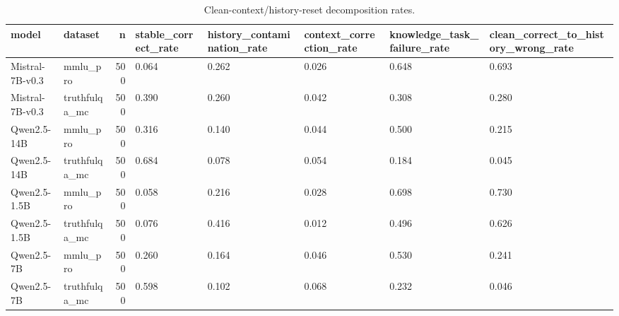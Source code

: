 \begin{table}
\caption{Clean-context/history-reset decomposition rates.}
\label{tab:decomposition_rates}
\begin{tabular}{llrlllll}
\toprule
model & dataset & n & stable\_correct\_rate & history\_contamination\_rate & context\_correction\_rate & knowledge\_task\_failure\_rate & clean\_correct\_to\_history\_wrong\_rate \\
\midrule
Mistral-7B-v0.3 & mmlu\_pro & 500 & 0.064 & 0.262 & 0.026 & 0.648 & 0.693 \\
Mistral-7B-v0.3 & truthfulqa\_mc & 500 & 0.390 & 0.260 & 0.042 & 0.308 & 0.280 \\
Qwen2.5-14B & mmlu\_pro & 500 & 0.316 & 0.140 & 0.044 & 0.500 & 0.215 \\
Qwen2.5-14B & truthfulqa\_mc & 500 & 0.684 & 0.078 & 0.054 & 0.184 & 0.045 \\
Qwen2.5-1.5B & mmlu\_pro & 500 & 0.058 & 0.216 & 0.028 & 0.698 & 0.730 \\
Qwen2.5-1.5B & truthfulqa\_mc & 500 & 0.076 & 0.416 & 0.012 & 0.496 & 0.626 \\
Qwen2.5-7B & mmlu\_pro & 500 & 0.260 & 0.164 & 0.046 & 0.530 & 0.241 \\
Qwen2.5-7B & truthfulqa\_mc & 500 & 0.598 & 0.102 & 0.068 & 0.232 & 0.046 \\
\bottomrule
\end{tabular}
\end{table}
